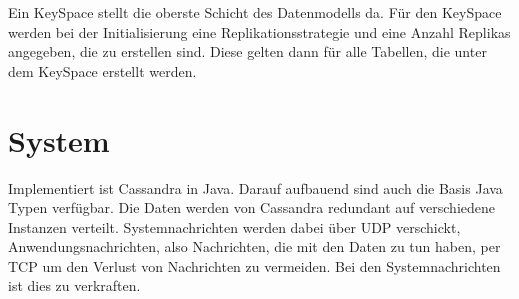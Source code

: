 Ein KeySpace stellt die oberste Schicht des Datenmodells da. Für den KeySpace werden bei der Initialisierung eine Replikationsstrategie und eine Anzahl Replikas angegeben, die zu erstellen sind. Diese gelten dann für alle Tabellen, die unter dem KeySpace erstellt werden.

\section{System}
Implementiert ist Cassandra in Java. Darauf aufbauend sind auch die Basis Java Typen verfügbar. Die Daten werden von Cassandra redundant auf verschiedene Instanzen verteilt. Systemnachrichten werden dabei über UDP verschickt, Anwendungsnachrichten, also Nachrichten, die mit den Daten zu tun haben, per TCP um den Verlust von Nachrichten zu vermeiden. Bei den Systemnachrichten ist dies zu verkraften.

